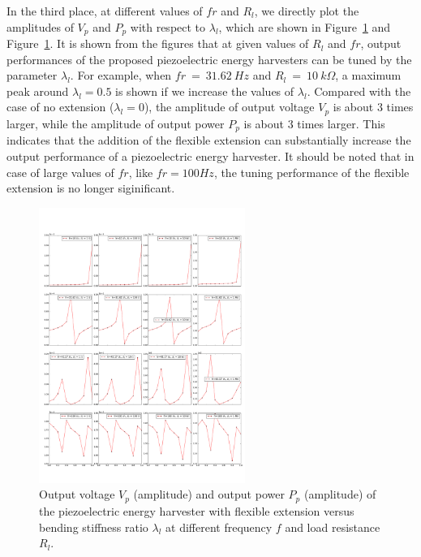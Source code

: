 \documentclass{elsarticle}
\begin{document}
In the third place, at different values of $fr$ and $R_l$, we directly plot the amplitudes of $V_p$ and $P_p$ with respect to $\lambda_l$, which are shown in Figure~\ref{fig:fig_vol_fr_sl_Rl_sl_vs_laml} and Figure~\ref{fig:fig_vol_fr_sl_Rl_sl_vs_laml}. It is shown from the figures that at given values of $R_l$ and $fr$, output performances of the proposed piezoelectric energy harvesters can be tuned by the parameter $\lambda_l$. For example, when $fr\ =\ 31.62\ Hz$ and $R_l\ =\ 10\ k\Omega$, a maximum peak around $
\lambda_l = 0.5$ is shown if we increase the values of $\lambda_l$. Compared with the case of no extension ($\lambda_l = 0$), the amplitude of output voltage $V_p$ is about $3$ times larger, while the amplitude of output power $P_p$ is about $3$ times larger. This indicates that the addition of the flexible extension can substantially increase the output performance of a piezoelectric energy harvester. It should be noted that in case of large values of $fr$, like $fr = 100 Hz$, the tuning performance of the flexible extension is no longer siginificant.

\begin{figure}[!htbp]
    \centering
    \includegraphics[width=0.6\textwidth]{./fig_vol_fr_sl_Rl_sl_vs_laml}
    \caption{Output voltage $V_p$ (amplitude) and output power $P_p$ (amplitude) of the piezoelectric energy harvester with flexible extension versus bending stiffness ratio $\lambda_l$ at different frequency $f$ and load resistance $R_l$. }
    \label{fig:fig_vol_fr_sl_Rl_sl_vs_laml}
\end{figure}
\end{document}
